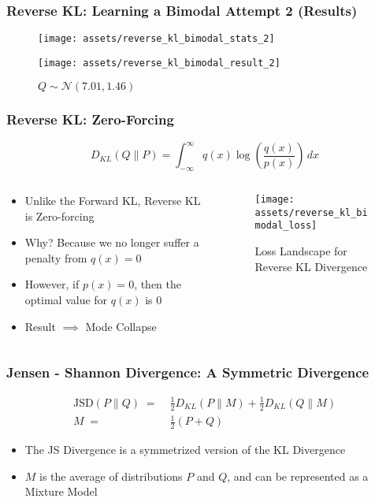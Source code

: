 \documentclass{beamer}
\begin{document}
\begin{frame}
  \frametitle{Reverse KL: Learning a Bimodal Attempt 2 (Results)}
  \begin{figure}
    \centering
    \texttt{[image: assets/reverse\_kl\_bimodal\_stats\_2]}
  \end{figure}
  \begin{figure}
    \centering
    \texttt{[image: assets/reverse\_kl\_bimodal\_result\_2]}
    \caption{$Q \sim \mathcal{N}(7.01, 1.46)$}
  \end{figure}
\end{frame}


\begin{frame}
  \frametitle{Reverse KL: Zero-Forcing}
  \begin{equation*}
    D_{KL} (Q \parallel P) = \int_{-\infty}^{\infty} q(x)\log \left({\frac {q(x)}{p(x)}}\right)\,dx
  \end{equation*}
  \begin{columns}
    \begin{column}{0.48\textwidth}
    \begin{itemize}
      \item Unlike the Forward KL, Reverse KL is Zero-forcing
      \item Why? Because we no longer suffer a penalty from $q(x) = 0$
      \item However, if $p(x) = 0$, then the optimal value for $q(x)$ is $0$
      \item Result $\implies$ Mode Collapse
    \end{itemize}
    \end{column}
    \begin{column}{0.48\textwidth}
      \begin{figure}
        \centering
        \texttt{[image: assets/reverse\_kl\_bimodal\_loss]}
        \caption{Loss Landscape for Reverse KL Divergence}
      \end{figure}
    \end{column}
  \end{columns}
\end{frame}


\begin{frame}
  \frametitle{Jensen - Shannon Divergence: A Symmetric Divergence}
  \begin{equation*}
    \begin{aligned}
      \text{JSD}(P \parallel Q) \;=&\; \frac{1}{2} D_{KL}(P \parallel M) + \frac{1}{2} D_{KL}(Q \parallel M) \\
      M \;=&\; \frac{1}{2} (P + Q)
    \end{aligned}
  \end{equation*}
  \begin{itemize}
    \item The JS Divergence is a symmetrized version of the
      KL Divergence
    \item $M$ is the average of distributions $P$ and $Q$, and can be
      represented as a Mixture Model
  \end{itemize}
\end{frame}
\end{document}
